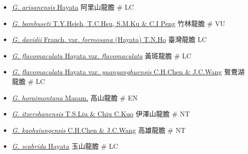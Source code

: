 \begin{itemize}
  \begin{itemize}
        \item[] \href{http://www.theplantlist.org/tpl1.1/search?q=Gentiana+arisanensis}{\textit{G. arisanensis} Hayata}   阿里山龍膽  \# LC
        \item[] \href{http://www.theplantlist.org/tpl1.1/search?q=Gentiana+bambuseti}{\textit{G. bambuseti} T.Y.Hsieh, T.C.Hsu, S.M.Ku \& C.I Peng}   竹林龍膽  \# VU
        \item[] \href{http://www.theplantlist.org/tpl1.1/search?q=Gentiana+davidii+var.+formosana}{\textit{G. davidii} Franch. var. \textit{formosana} (Hayata) T.N.Ho}   臺灣龍膽   LC
        \item[] \href{http://www.theplantlist.org/tpl1.1/search?q=Gentiana+flavomaculata+var.+flavomaculata}{\textit{G. flavomaculata} Hayata var. \textit{flavomaculata}}   黃斑龍膽  \# LC
        \item[] \href{http://www.theplantlist.org/tpl1.1/search?q=Gentiana+flavomaculata+var.+yuanyanghuensis}{\textit{G. flavomaculata} Hayata var. \textit{yuanyanghuensis} C.H.Chen \& J.C.Wang}   鴛鴦湖龍膽  \# LC
        \item[] \href{http://www.theplantlist.org/tpl1.1/search?q=Gentiana+horaimontana}{\textit{G. horaimontana} Masam.}   高山龍膽  \# EN
        \item[] \href{http://www.theplantlist.org/tpl1.1/search?q=Gentiana+itzershanensis}{\textit{G. itzershanensis} T.S.Liu \& Chiu C.Kuo}   伊澤山龍膽  \# NT
        \item[] \href{http://www.theplantlist.org/tpl1.1/search?q=Gentiana+kaohsiungensis}{\textit{G. kaohsiungensis} C.H.Chen \& J.C.Wang}   高雄龍膽  \# NT
        \item[] \href{http://www.theplantlist.org/tpl1.1/search?q=Gentiana+scabrida}{\textit{G. scabrida} Hayata}   玉山龍膽  \# LC

\end{itemize}
\end{itemize}
